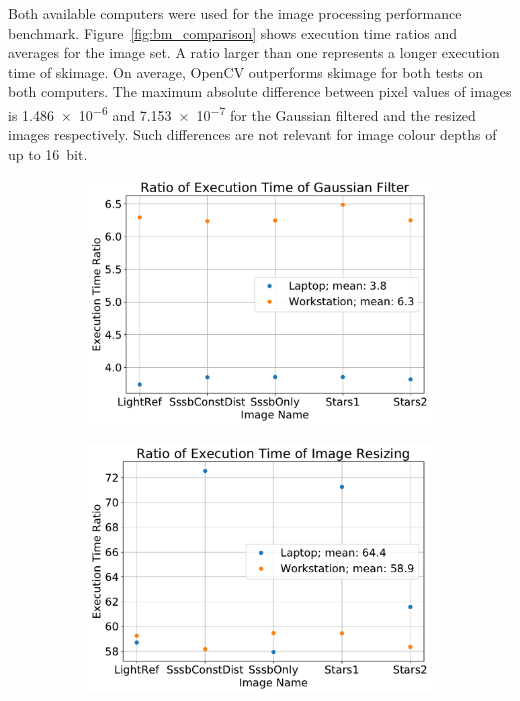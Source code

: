 Both available computers were used for the image processing performance benchmark. Figure~\ref{fig:bm_comparison} shows execution time ratios and averages for the image set. A ratio larger than one represents a longer execution time of \gls{skimage}. On average, OpenCV outperforms \gls{skimage} for both tests on both computers. The maximum absolute difference between pixel values of images is \SI{1.486e-6}{} and \SI{7.153e-7}{} for the Gaussian filtered and the resized images respectively. Such differences are not relevant for image colour depths of up to \SI{16}{bit}.


\begin{figure}[htb]
    \centering
    \begin{subfigure}[b]{0.47\textwidth}
        \centering
        \includegraphics[width=\textwidth]{doc/thesis/0_figures/cv_skimage/Comparison_Gaussian}
        \caption{}
        \label{fig:bm_comparison_gauss}
    \end{subfigure}
    \begin{subfigure}[b]{0.47\textwidth}
        \centering
        \includegraphics[width=\textwidth]{doc/thesis/0_figures/cv_skimage/Comparison_Resize}

\end{subfigure}
\end{figure}
